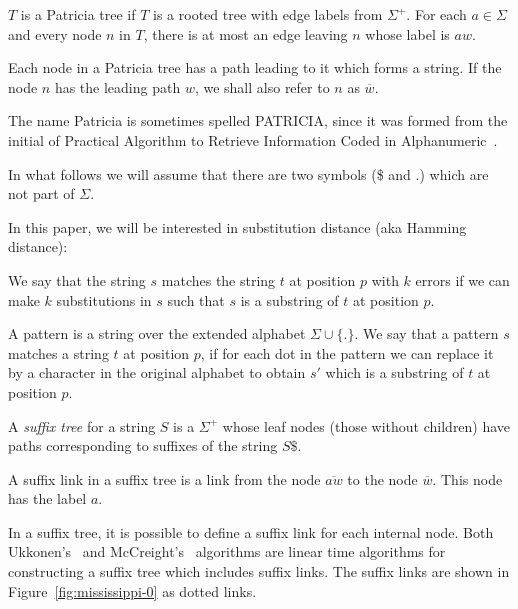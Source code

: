 \begin{definition}
$T$ is a Patricia tree if $T$ is a rooted tree with edge labels from $\Sigma^+$. For each $a \in \Sigma$ and every node $n$ in $T$, there is at most an edge leaving $n$ whose label is $aw$.

Each node in a Patricia tree has a path leading to it which forms a string. If the node $n$ has the leading path $w$, we shall also refer to $n$ as $\overline{w}$.
\end{definition}

The name Patricia is sometimes spelled PATRICIA, since it was formed from the initial of Practical Algorithm to Retrieve Information Coded in Alphanumeric~\cite{morrison:patricia}.

In what follows we will assume that there are two symbols (\$ and $.$) which are not part of $\Sigma$.

In this paper, we will be interested in substitution distance (aka Hamming distance):

\begin{definition}
We say that the string $s$ matches the string $t$ at position $p$ with $k$ errors if we can make $k$ substitutions in $s$ such that $s$ is a substring of $t$ at position $p$.
\end{definition}


\begin{definition}[Pattern]
A pattern is a string over the extended alphabet $\Sigma\cup\{.\}$. We say that a pattern $s$ matches a string $t$ at position $p$, if for each dot in the pattern we can replace it by a character in the original alphabet to obtain $s'$ which is a substring of $t$ at position $p$.
\end{definition}

\begin{definition}
A \emph{suffix tree} for a string $S$ is a $\Sigma^+$ whose leaf nodes (those without children) have paths corresponding to suffixes of the string $S\$ $.
\end{definition}

\begin{definition}
A suffix link in a suffix tree is a link from the node $\overline{aw}$ to the node $\overline{w}$. This node has the label $a$.
\end{definition}

In a suffix tree, it is possible to define a suffix link for each internal node. Both Ukkonen's~\cite{ukkonen} and McCreight's~\cite{mccreight} algorithms are linear time algorithms for constructing a suffix tree which includes suffix links. The suffix links are shown in Figure~\ref{fig:mississippi-0} as dotted links.

